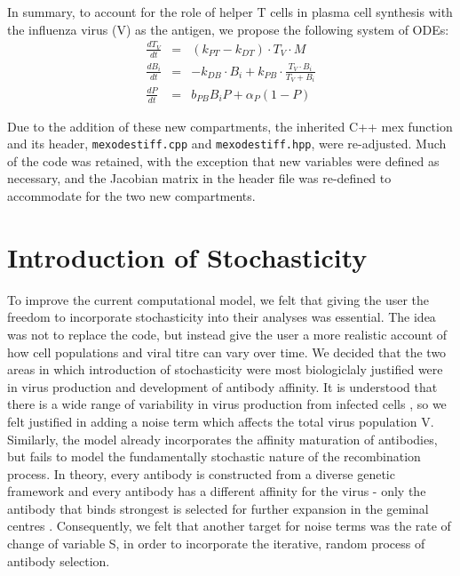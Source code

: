 \documentclass[a4paper, 12pt]{report}
\begin{document}
In summary, to account for the role of helper T cells in plasma cell synthesis with the influenza virus (V) as the antigen, we propose the following system of ODEs:
\begin{eqnarray*}
\frac{dT_V}{dt} &=& (k_{PT}-k_{DT}) \cdot T_V \cdot M \\
\frac{dB_i}{dt} &=& -k_{DB} \cdot B_i + k_{PB} \cdot \frac{T_{V} \cdot B_{i}}{T_{V}+B_{i}} \\
\frac{dP}{dt} &=& b_{PB}B_{i}P + \alpha_{P}(1 - P)
\end{eqnarray*}

Due to the addition of these new compartments, the inherited C++ mex function and its header, \texttt{mexodestiff.cpp} and \texttt{mexodestiff.hpp}, were re-adjusted. Much of the code was retained, with the exception that new variables were defined as necessary, and the Jacobian matrix in the header file was re-defined to accommodate for the two new compartments.

\section{Introduction of Stochasticity} %
To improve the current computational model, we felt that giving the user the freedom to incorporate stochasticity into their analyses was essential. The idea was not to replace the code, but instead give the user a more realistic account of how cell populations and viral titre can vary over time. We decided that the two areas in which introduction of stochasticity were most biologiclaly justified were in virus production and development of antibody affinity. It is understood that there is a wide range of variability in virus production from infected cells \cite{MitchellJanuary152011}, so we felt justified in adding a noise term which affects the total virus population V.\\

Similarly, the model already incorporates the affinity maturation of antibodies, but fails to model the fundamentally stochastic nature of the recombination process. In theory, every antibody is constructed from a diverse genetic framework and every antibody has a different affinity for the virus - only the antibody that binds strongest is selected for further expansion in the geminal centres \cite{Grimaldi15022005}. Consequently, we felt that another target for noise terms was the rate of change of variable S, in order to incorporate the iterative, random process of antibody selection.\\
\end{document}
